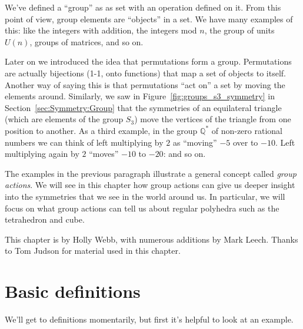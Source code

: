 We've defined a  ``group'' as as set with an operation defined on it.  From this point of view, group elements are ``objects'' in a set. We have many examples of this: like the integers with addition, the integers mod $n$, the group of units $U(n)$, groups of matrices, and so on.

Later on we introduced the idea that permutations form a group. Permutations are actually bijections (1-1, onto functions) that map a set of objects to itself.  Another way of saying this is that permutations ``act on'' a set by moving the elements around.  Similarly, we saw in Figure~\ref{fig:groups_s3_symmetry} in Section~\ref{sec:Symmetry:Group} that the symmetries of an equilateral triangle (which are elements of the group $S_3$) move the vertices of the triangle from one position to another.  As a third example, in the group $\mathbb {Q}^*$ of non-zero rational numbers we can think of left multiplying by $2$ as ``moving''  $-5$ over to $-10$.  Left multiplying again by $2$ ``moves'' $-10$ to $-20$: and so on.   

The examples in the previous paragraph  illustrate a general concept called \emph{group actions}. We will see in this chapter how group actions can give us deeper insight into the symmetries that we see in the world around us. In particular, we will focus on what group actions can tell us about regular polyhedra such as the tetrahedron and cube.
\bigskip

This chapter  is by Holly Webb, with numerous additions by Mark Leech. Thanks to Tom Judson for material used in this chapter.

\section{Basic definitions\quad
{}}
\label{sec:GroupActions:Definitions}

We'll get to definitions momentarily, but first it's helpful to look at an example.

